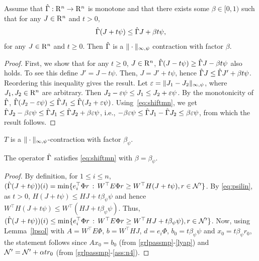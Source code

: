 \begin{lemma}\label{maxnormmn}
Assume that $\hat{\Gamma}: \mathrm{R}^n \to \mathrm{R}^n$ is monotone and 
that there exists some $\beta\in [0,1)$ such that for any $J\in \mathrm{R}^n$ and $t>0$,
\begin{align}
\label{eq:shiftmn}
\hg( J + t \psi) \le \hg J + \beta t \psi,
\end{align} 
for any $J\in \mathrm{R}^n$ and $t\ge 0$.
Then $\hat{\Gamma}$ is a $\|\cdot\|_{\infty,\psi}$ contraction with factor $\beta$.
\end{lemma}
\begin{proof}
First, we show that for any $t\ge 0$,  $J\in \mathrm{R}^n$,
$\hat{\Gamma}( J - t \psi) \ge \hat{\Gamma} J - \beta t \psi$ also holds.
To see this define $J' = J-t\psi$. Then, $J = J'+t\psi$, hence $\hat{\Gamma} J \le \hat{\Gamma} J' + \beta t \psi$. Reordering this inequality gives the result.
Let $\varepsilon = \|J_1 - J_2\|_{\infty,\psi}$, where $J_1,J_2\in \mathrm{R}^n$ are arbitrary.
Then $J_2 - \varepsilon \psi \le J_1 \le J_2 + \varepsilon \psi$. 
By the monotonicity of $\hat{\Gamma}$,
$\hat{\Gamma}(J_2 - \varepsilon \psi) \le \hat{\Gamma} J_1 \le \hat{\Gamma}(J_2 + \varepsilon \psi)$. 
Using~\eqref{eq:shiftmn}, we get 
$\hat{\Gamma} J_2 - \beta \varepsilon \psi \le \hat{\Gamma} J_1 \le \hat{\Gamma} J_2 + \beta \varepsilon \psi$, i.e., $-\beta \varepsilon \psi \le \hat{\Gamma} J_1 - \hat{\Gamma} J_2 \le \beta \varepsilon \psi$, from which the result follows.
\end{proof}
\begin{corollary}\label{tmaxnormmn}
$T$ is a $\|\cdot\|_{\infty,\psi}$-contraction with factor $\beta_{\psi}$.
\end{corollary}
\begin{lemma}\label{gshiftmn}
The operator $\hat{\Gamma}$ satisfies \eqref{eq:shiftmn} with $\beta = \beta_\psi$.
\end{lemma}
\begin{proof}
By definition, for $1\le i \le n$, $(\hat{\Gamma} (J+t\psi) )(i) = \min\{ e_i^\top \Phi r \,:\, W^\top E\Phi r \ge W^\top H(J+t\psi), r\in \mathcal{N}' \}$.
By \eqref{eq:psilin}, as $t>0$, $H(J+t\psi) \le HJ + t \beta_\psi \psi$ and hence $W^\top H(J+t\psi) \le W^\top (HJ + t \beta_\psi \psi)$. Thus,
$(\hat{\Gamma} (J+t\psi) )(i) \le 
 \min\{ e_i^\top \Phi r \,:\, W^\top E\Phi r \ge W^\top HJ+t\beta_\psi \psi), r\in \mathcal{N}' \}$.
Now, using Lemma~\ref{lpsol} with $A=W^\top E \Phi$, $b=W^\top HJ$, $d=e_i\Phi$, $b_0=t\beta_\psi \psi$
and $x_0=t \beta_\psi r_0$, the statement follows since $A x_0 = b_0$ (from \cref{grlpassmp}-\eqref{lyap}) and $\mathcal{N}' = \mathcal{N}' + \alpha t r_0$ (from \cref{grlpassmp}-\eqref{ass:n4}).
\end{proof}

